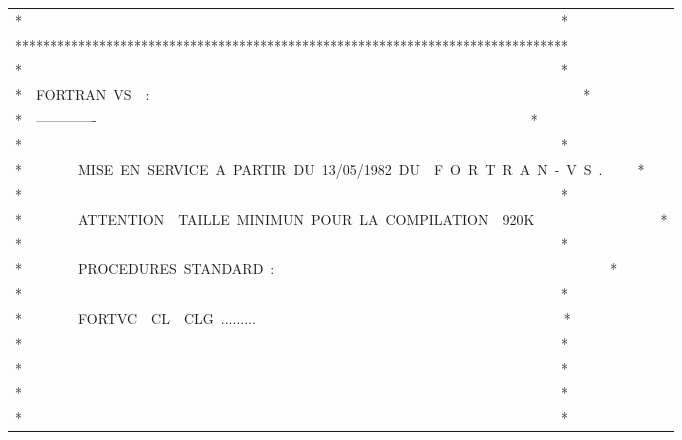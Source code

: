 {\begin{tabular}{@{}l@{}}
*~~~~~~~~~~~~~~~~~~~~~~~~~~~~~~~~~~~~~~~~~~~~~~~~~~~~~~~~~~~~~~~~~~~~~~~~~~~~~*\\
*******************************************************************************\\
*~~~~~~~~~~~~~~~~~~~~~~~~~~~~~~~~~~~~~~~~~~~~~~~~~~~~~~~~~~~~~~~~~~~~~~~~~~~~~*\\
*~~FORTRAN~VS~~:~~~~~~~~~~~~~~~~~~~~~~~~~~~~~~~~~~~~~~~~~~~~~~~~~~~~~~~~~~~~~~*\\
*~~-------------~~~~~~~~~~~~~~~~~~~~~~~~~~~~~~~~~~~~~~~~~~~~~~~~~~~~~~~~~~~~~~*\\
*~~~~~~~~~~~~~~~~~~~~~~~~~~~~~~~~~~~~~~~~~~~~~~~~~~~~~~~~~~~~~~~~~~~~~~~~~~~~~*\\
*~~~~~~~~MISE~EN~SERVICE~A~PARTIR~DU~13/05/1982~DU~~F~O~R~T~R~A~N~-~V~S~.~~~~~*\\
*~~~~~~~~~~~~~~~~~~~~~~~~~~~~~~~~~~~~~~~~~~~~~~~~~~~~~~~~~~~~~~~~~~~~~~~~~~~~~*\\
*~~~~~~~~ATTENTION~~TAILLE~MINIMUN~POUR~LA~COMPILATION~~920K~~~~~~~~~~~~~~~~~~*\\
*~~~~~~~~~~~~~~~~~~~~~~~~~~~~~~~~~~~~~~~~~~~~~~~~~~~~~~~~~~~~~~~~~~~~~~~~~~~~~*\\
*~~~~~~~~PROCEDURES~STANDARD~:~~~~~~~~~~~~~~~~~~~~~~~~~~~~~~~~~~~~~~~~~~~~~~~~*\\
*~~~~~~~~~~~~~~~~~~~~~~~~~~~~~~~~~~~~~~~~~~~~~~~~~~~~~~~~~~~~~~~~~~~~~~~~~~~~~*\\
*~~~~~~~~FORTVC~~CL~~CLG~.........~~~~~~~~~~~~~~~~~~~~~~~~~~~~~~~~~~~~~~~~~~~~*\\
*~~~~~~~~~~~~~~~~~~~~~~~~~~~~~~~~~~~~~~~~~~~~~~~~~~~~~~~~~~~~~~~~~~~~~~~~~~~~~*\\
*~~~~~~~~~~~~~~~~~~~~~~~~~~~~~~~~~~~~~~~~~~~~~~~~~~~~~~~~~~~~~~~~~~~~~~~~~~~~~*\\
*~~~~~~~~~~~~~~~~~~~~~~~~~~~~~~~~~~~~~~~~~~~~~~~~~~~~~~~~~~~~~~~~~~~~~~~~~~~~~*\\
*~~~~~~~~~~~~~~~~~~~~~~~~~~~~~~~~~~~~~~~~~~~~~~~~~~~~~~~~~~~~~~~~~~~~~~~~~~~~~*
\end{tabular}}

